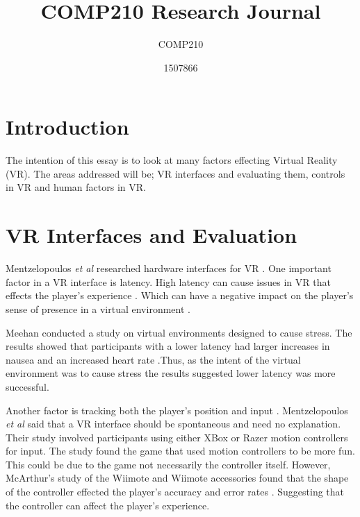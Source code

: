 \documentclass{scrartcl}
\title{COMP210 Research Journal}
\subtitle{COMP210}
\author{1507866}
\begin{document}
	
\maketitle
	

\section{Introduction}
The intention of this essay is to look at many factors effecting Virtual Reality (VR). The areas addressed will be; VR interfaces and evaluating them, controls in VR and  human factors in VR. 
	
\section{VR Interfaces and Evaluation}
Mentzelopoulos \textit{et al} researched hardware interfaces for VR \cite{Mentzelopoulos}.  
One important factor in a VR interface is latency. High latency can cause issues in VR that effects the player's experience \cite{Mentzelopoulos, Meehan}. Which can have a negative impact on the player's sense of presence in a virtual environment \cite{Meehan}. 
 
\bigskip 
 
Meehan conducted a study on virtual environments designed to cause stress. The results showed that participants with a lower latency had larger increases in nausea and an increased heart rate \cite{Meehan}.Thus,  as the intent of the virtual environment was to cause stress the results suggested lower latency was more successful.

\bigskip

Another factor is tracking both the player's position and input \cite{Mentzelopoulos}. Mentzelopoulos \textit{et al} said that a VR interface should be spontaneous and need no explanation. Their study involved participants using either XBox or Razer motion controllers for input. The study found the game that used motion controllers to be more fun. This could be due to the game not necessarily the controller itself.  However, McArthur's study of the Wiimote and  Wiimote accessories found that the shape of the controller effected the player's accuracy and error rates \cite{McArthur}. Suggesting that the controller can affect the player's experience.

\bigskip  
\end{document}
